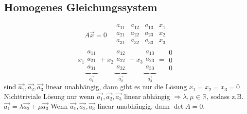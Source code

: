 \documentclass[11pt]{article}
\begin{document}
\subsection{Homogenes Gleichungssystem}
\label{sec-13-2}
\[A\vec{x}=0\quad\begin{matrix}
   a_{11} & a_{12} & a_{13} \\
   a_{21} & a_{22} & a_{23} \\
   a_{31} & a_{32} & a_{33} \\
   \end{matrix}\begin{matrix}
   x_1\\
   x_2\\
   x_3\\
   \end{matrix}\]
\[
   x_1 \underbrace{ \begin{matrix} a_{11} \\ a_{21} \\ a_{31} \end{matrix}}_{\vec{a_1}} +
   x_2 \underbrace{ \begin{matrix} a_{12} \\ a_{22} \\ a_{32} \end{matrix}}_{\vec{a_2}} +
   x_3 \underbrace{ \begin{matrix} a_{13} \\ a_{23} \\ a_{33} \end{matrix}}_{\vec{a_3}}
   = \begin{matrix} 0 \\ 0 \\ 0\end{matrix}
   \]
sind $\vec{a_1},\vec{a_2}, \vec{a_3}$ linear unabhängig, dann gibt es nur die Lösung $x_1=x_2=x_3=0$
Nichttriviale Lösung nur wenn $\vec{a_1},\vec{a_2}, \vec{a_3}$ linear abhängig $\Rightarrow \lambda,\mu\in\mathbb{R}$, sodass z.B. $\vec{a_1} = \lambda\vec{a_2} + \mu\vec{a_3}$
Wenn $\vec{a_1},\vec{a_2}, \vec{a_3}$ linear unabhängig, dann $\det A = 0$.
\end{document}
